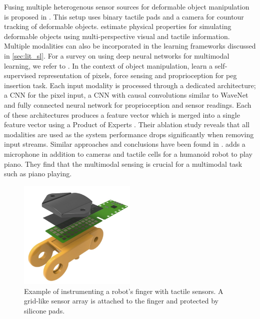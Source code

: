 \documentclass[\home/main.tex]{subfiles}
\begin{document}
Fusing multiple heterogenous sensor sources for deformable object manipulation is proposed in \autocite{khalil2010integrated}. This setup uses binary tactile pads and a camera for countour tracking of deformable objects. \Textcite{Frank2010} estimate physical properties for simulating deformable objects using multi-perspective visual and tactile information. Multiple modalities can also be incorporated in the learning frameworks discussed in \cref{sec:lit_sl}. For a survey on using deep neural networks for multimodal learning, we refer to \autocite{ramachandram2017deep}. In the context of object manipulation, \autocite{lee2020making} learn a self-supervised representation of pixels, force sensing and proprioception for peg insertion task. Each input modality is processed through a dedicated architecture; a \gls{CNN} for the pixel input, a \gls{CNN} with causal convolutions similar to WaveNet \autocite{WaveNet} and fully connected neural network for proprioception and sensor readings. Each of these architectures produces a feature vector which is merged into a single feature vector using a Product of Experts \autocite{hinton2002training}. Their ablation study reveals that all modalities are used as the system performance drops significantly when removing input streams. Similar approaches and conclusions have been found in \autocite{Calandra2018, Droniou2015, balakuntala2021learning}. \Textcite{zambelli2016online} adds a microphone in addition to cameras and tactile cells for a humanoid robot to play piano. They find that the multimodal sensing is crucial for a multimodal task such as piano playing.  

\begin{figure}[htbp]
	\centering
	\includegraphics[width=0.5\textwidth]{figures/velostat-sensor.jpg}	
	\caption[Example of instrumenting the robot.]{Example of instrumenting a robot's finger with tactile sensors. A grid-like sensor array is attached to the finger and protected by silicone pads.}
	\label{fig:instrumentation_example}
\end{figure}
\end{document}
